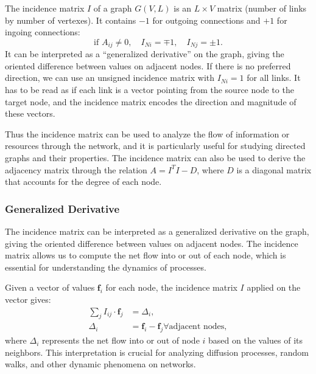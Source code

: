 \begin{definition}
    The incidence matrix $I$ of a graph $G(V,L)$ is an $L \times V$ matrix (number of links by number of vertexes). It contains $-1$ for outgoing connections and $+1$ for ingoing connections:
    \[
        \text{if } A_{ij} \neq 0, \quad I_{Ni} = \mp 1, \quad I_{Nj} = \pm 1.
    \]
    It can be interpreted as a ``generalized derivative'' on the graph, giving the oriented difference between values on adjacent nodes. If there is no preferred direction, we can use an unsigned incidence matrix with $I_{Ni} = 1$ for all links. It has to be read as if each link is a vector pointing from the source node to the target node, and the incidence matrix encodes the direction and magnitude of these vectors.
\end{definition}

Thus the incidence matrix can be used to analyze the flow of information or resources through the network, and it is particularly useful for studying directed graphs and their properties. The incidence matrix can also be used to derive the adjacency matrix through the relation $A = I^T I - D$, where $D$ is a diagonal matrix that accounts for the degree of each node.

\subsubsection{Generalized Derivative}

The incidence matrix can be interpreted as a generalized derivative on the graph, giving the oriented difference between values on adjacent nodes. The incidence matrix allows us to compute the net flow into or out of each node, which is essential for understanding the dynamics of processes.

Given a vector of values \(\mathbf{f}_i\) for each node, the incidence matrix \(I\) applied on the vector gives:
\[
    \begin{aligned}
        \sum_{j} I_{ij} \cdot \mathbf{f}_j & = \Delta_i,                                                  \\
        \Delta_i                           & = \mathbf{f}_i - \mathbf{f}_j \forall \text{adjacent nodes},
    \end{aligned}
\]
where \(\Delta_i\) represents the net flow into or out of node \(i\) based on the values of its neighbors. This interpretation is crucial for analyzing diffusion processes, random walks, and other dynamic phenomena on networks.


